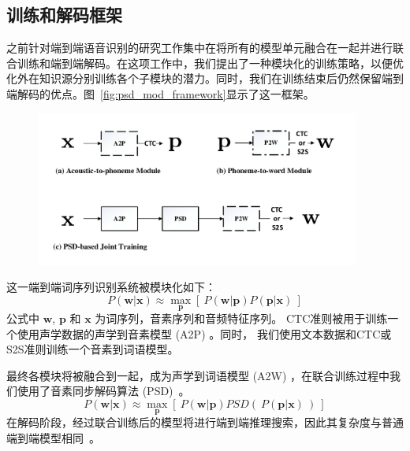 \subsection{训练和解码框架}
\label{sec:psd_mod_framework}

之前针对端到端语音识别的研究工作集中在将所有的模型单元融合在一起并进行联合训练和端到端解码。在这项工作中，我们提出了一种模块化的训练策略，以便优化外在知识源分别训练各个子模块的潜力。同时，我们在训练结束后仍然保留端到端解码的优点。图~\ref{fig:psd_mod_framework}显示了这一框架。


\begin{figure}[htb]
  \centering
    \captionstyle{\centering}
    \includegraphics[width=0.95\textwidth]{figure/psd_mod_framework.pdf}
\end{figure}


这一端到端词序列识别系统被模块化如下：
\begin{equation}
\label{equ:framework-1}
P(\mathbf{w}|\mathbf{x})\approx\max_{\mathbf{p}} \left[\ P(\mathbf{w}|\mathbf{p})   P(\mathbf{p}|\mathbf{x})\ \right]
\end{equation}
公式中 $\mathbf{w}$, $\mathbf{p}$ 和 $\mathbf{x}$ 为词序列，音素序列和音频特征序列。
CTC准则被用于训练一个使用声学数据的声学到音素模型 (A2P)  。同时， 我们使用文本数据和CTC或S2S准则训练一个音素到词语模型。

最终各模块将被融合到一起，成为声学到词语模型 (A2W) ，在联合训练过程中我们使用了音素同步解码算法 (PSD)~\cite{zhc00-chen-tasl2017}。
\begin{equation}
\label{equ:framework-2}
P(\mathbf{w}|\mathbf{x})\approx \max_{\mathbf{p}}\left[\ P(\mathbf{w}|\mathbf{p})   PSD(\ P(\mathbf{p}|\mathbf{x})\ )\ \right]
\end{equation}
在解码阶段，经过联合训练后的模型将进行端到端推理搜索，因此其复杂度与普通端到端模型相同~\cite{audhkhasi2017direct}。

